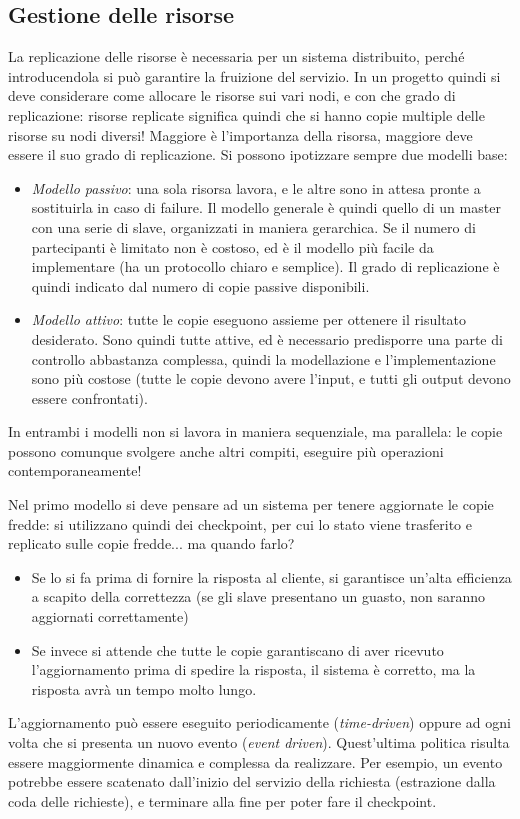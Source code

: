 \subsection{Gestione delle risorse}
La replicazione delle risorse è necessaria per un sistema distribuito, perché introducendola si può garantire la
fruizione del servizio. In un progetto quindi si deve considerare come allocare le risorse sui vari nodi, e con che
grado di replicazione: risorse replicate significa quindi che si hanno copie multiple delle risorse su nodi diversi!
Maggiore è l'importanza della risorsa, maggiore deve essere il suo grado di replicazione.
Si possono ipotizzare sempre due modelli base:
\begin{itemize}
 \item \textit{Modello passivo}: una sola risorsa lavora, e le altre sono in attesa pronte a sostituirla in caso di
 failure. Il modello generale è quindi quello di un master con una serie di slave, organizzati in maniera gerarchica.
 Se il numero di partecipanti è limitato non è costoso, ed è il modello più facile da implementare (ha un protocollo
 chiaro e semplice). Il grado di replicazione è quindi indicato dal numero di copie passive disponibili.
 \item \textit{Modello attivo}: tutte le copie eseguono assieme per ottenere il risultato desiderato. Sono quindi tutte
 attive, ed è necessario predisporre una parte di controllo abbastanza complessa, quindi la modellazione e
 l'implementazione sono più costose (tutte le copie devono avere l'input, e tutti gli output devono essere confrontati).
\end{itemize}
In entrambi i modelli non si lavora in maniera sequenziale, ma parallela: le copie possono comunque svolgere anche 
altri compiti, eseguire più operazioni contemporaneamente!

Nel primo modello si deve pensare ad un sistema per tenere aggiornate le copie fredde: si utilizzano quindi dei
checkpoint, per cui lo stato viene trasferito e replicato sulle copie fredde... ma quando farlo?
\begin{itemize}
 \item Se lo si fa prima di fornire la risposta al cliente, si garantisce un'alta efficienza a scapito della 
 correttezza (se gli slave presentano un guasto, non saranno aggiornati correttamente)
 \item Se invece si attende che tutte le copie garantiscano di aver ricevuto l'aggiornamento prima di spedire la
 risposta, il sistema è corretto, ma la risposta avrà un tempo molto lungo.
\end{itemize}
L'aggiornamento può essere eseguito periodicamente (\textit{time-driven}) oppure ad ogni volta che si presenta un nuovo
evento (\textit{event driven}). Quest'ultima politica risulta essere maggiormente dinamica e complessa da realizzare.
Per esempio, un evento potrebbe essere scatenato dall'inizio del servizio della richiesta (estrazione dalla coda delle
richieste), e terminare alla fine per poter fare il checkpoint.

